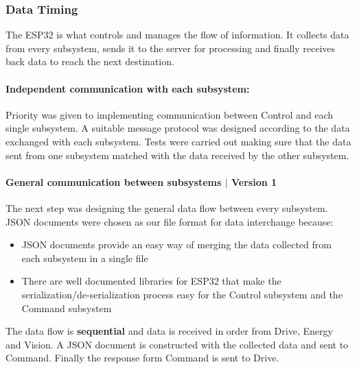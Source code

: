 \documentclass[10pt,twoside]{article}
\begin{document}
\subsubsection{Data Timing} 
The ESP32 is what controls and manages the flow of information. It collects data from every subsystem, sends it to the server for processing and finally receives back data to reach the next destination.


\paragraph{Independent communication with each subsystem:}
Priority was given to implementing communication between Control and each single subsystem. A suitable message protocol was designed according to the data exchanged with each subsystem. Tests were carried out making sure that the data sent from one subsystem matched with the data received by the other subsystem.

\paragraph{General communication between subsystems $\vert$ Version 1}
The next step was designing the general data flow between every subsystem. JSON  documents were chosen as  our  file  format  for  data  interchange because:
\begin{itemize}
    \item JSON documents provide an easy way of merging the data collected from each subsystem in a single file
    \item There are well documented libraries for ESP32 that make the serialization/de-serialization process easy for the Control subsystem and the Command subsystem
\end{itemize}
The data flow is \textbf{sequential} and data is received in order from Drive, Energy and Vision. A JSON document is constructed with the collected data and sent to Command. Finally the response form Command is sent to Drive.
\end{document}
